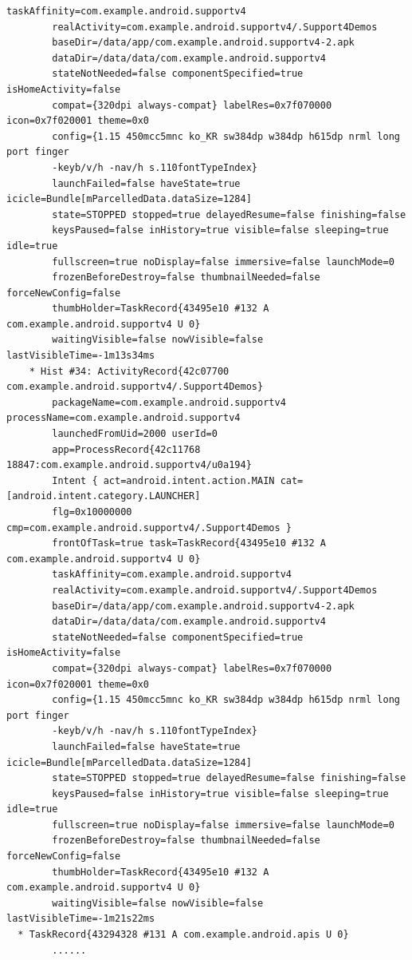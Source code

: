 \begin{lstlisting}[frame=single]
        taskAffinity=com.example.android.supportv4
        realActivity=com.example.android.supportv4/.Support4Demos
        baseDir=/data/app/com.example.android.supportv4-2.apk
        dataDir=/data/data/com.example.android.supportv4
        stateNotNeeded=false componentSpecified=true isHomeActivity=false
        compat={320dpi always-compat} labelRes=0x7f070000 icon=0x7f020001 theme=0x0
        config={1.15 450mcc5mnc ko_KR sw384dp w384dp h615dp nrml long port finger 
        -keyb/v/h -nav/h s.110fontTypeIndex}
        launchFailed=false haveState=true icicle=Bundle[mParcelledData.dataSize=1284]
        state=STOPPED stopped=true delayedResume=false finishing=false
        keysPaused=false inHistory=true visible=false sleeping=true idle=true
        fullscreen=true noDisplay=false immersive=false launchMode=0
        frozenBeforeDestroy=false thumbnailNeeded=false forceNewConfig=false
        thumbHolder=TaskRecord{43495e10 #132 A com.example.android.supportv4 U 0}
        waitingVisible=false nowVisible=false lastVisibleTime=-1m13s34ms
    * Hist #34: ActivityRecord{42c07700 com.example.android.supportv4/.Support4Demos}
        packageName=com.example.android.supportv4 processName=com.example.android.supportv4
        launchedFromUid=2000 userId=0
        app=ProcessRecord{42c11768 18847:com.example.android.supportv4/u0a194}
        Intent { act=android.intent.action.MAIN cat=[android.intent.category.LAUNCHER] 
        flg=0x10000000 cmp=com.example.android.supportv4/.Support4Demos }
        frontOfTask=true task=TaskRecord{43495e10 #132 A com.example.android.supportv4 U 0}
        taskAffinity=com.example.android.supportv4
        realActivity=com.example.android.supportv4/.Support4Demos
        baseDir=/data/app/com.example.android.supportv4-2.apk
        dataDir=/data/data/com.example.android.supportv4
        stateNotNeeded=false componentSpecified=true isHomeActivity=false
        compat={320dpi always-compat} labelRes=0x7f070000 icon=0x7f020001 theme=0x0
        config={1.15 450mcc5mnc ko_KR sw384dp w384dp h615dp nrml long port finger 
        -keyb/v/h -nav/h s.110fontTypeIndex}
        launchFailed=false haveState=true icicle=Bundle[mParcelledData.dataSize=1284]
        state=STOPPED stopped=true delayedResume=false finishing=false
        keysPaused=false inHistory=true visible=false sleeping=true idle=true
        fullscreen=true noDisplay=false immersive=false launchMode=0
        frozenBeforeDestroy=false thumbnailNeeded=false forceNewConfig=false
        thumbHolder=TaskRecord{43495e10 #132 A com.example.android.supportv4 U 0}
        waitingVisible=false nowVisible=false lastVisibleTime=-1m21s22ms
  * TaskRecord{43294328 #131 A com.example.android.apis U 0}
        ......
        

\end{lstlisting}
